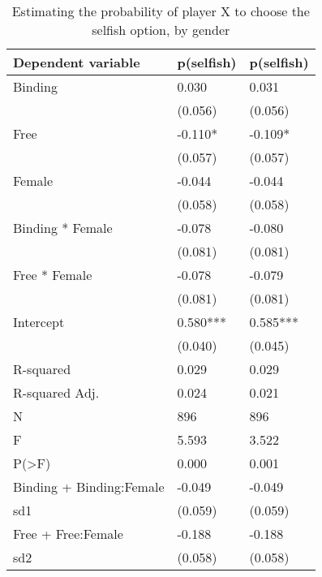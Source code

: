\begin{table}
\centering
\caption{Estimating the probability of player X to choose the selfish option, by gender}
\label{decision_female}
\begin{tabular}{lll}
\toprule
Dependent variable & p(selfish) & p(selfish) \\
\midrule
Binding                  &      0.030 &      0.031 \\
                         &    (0.056) &    (0.056) \\
Free                     &    -0.110* &    -0.109* \\
                         &    (0.057) &    (0.057) \\
Female                   &     -0.044 &     -0.044 \\
                         &    (0.058) &    (0.058) \\
Binding * Female         &     -0.078 &     -0.080 \\
                         &    (0.081) &    (0.081) \\
Free * Female            &     -0.078 &     -0.079 \\
                         &    (0.081) &    (0.081) \\
Intercept                &   0.580*** &   0.585*** \\
                         &    (0.040) &    (0.045) \\
R-squared                &      0.029 &      0.029 \\
R-squared Adj.           &      0.024 &      0.021 \\
N                        &        896 &        896 \\
F                        &      5.593 &      3.522 \\
P(>F)                    &      0.000 &      0.001 \\
Binding + Binding:Female &     -0.049 &     -0.049 \\
sd1                      &    (0.059) &    (0.059) \\
Free + Free:Female       &     -0.188 &     -0.188 \\
sd2                      &    (0.058) &    (0.058) \\
\bottomrule
\end{tabular}
\end{table}
